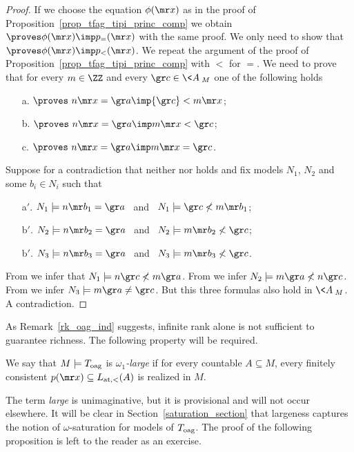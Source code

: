 \begin{proof}
  If we choose the equation $\phi({\mr x})$ as in the proof of Proposition~\ref{prop_tfag_tipi_princ_comp} we obtain $\proves\phi({\mr x})\imp p_{=}({\mr x})$ with the same proof.
  We only need to show that $\proves\phi({\mr x})\imp p_{<}({\mr x})$.
  We repeat the argument of the proof of Proposition~\ref{prop_tfag_tipi_princ_comp} with $<$ for $=$.
  We need to prove that for every $m\in\ZZ$ and every ${\gr c}\in\<A\>_M$ one of the following holds
  \begin{itemize}
  \item[a.] $\proves\   n{\mr x}={\gr a}\imp{\gr c}<m{\mr x}$;
  \item[b.] $\proves\   n{\mr x}={\gr a}\imp m{\mr x}<{\gr c}$;
  \item[c.] $\proves\   n{\mr x}={\gr a}\imp m{\mr x}={\gr c}$.
  \end{itemize}
  Suppose for a contradiction that neither  nor  holds and fix models $N_1$, $N_2$ and some $b_i\in N_i$ such that
  \begin{itemize}
  \item[a$'$.] $N_1\models n{\mr b_1}={\gr a}$ \ and \ $N_1\models {\gr c}\not<m{\mr b_1}$;
  \item[b$'$.] $N_2\models n{\mr b_2}={\gr a}$ \ and \ $N_2\models m{\mr b_2}\not< {\gr c}$;
  \item[b$'$.] $N_3\models n{\mr b_3}={\gr a}$ \ and \ $N_3\models m{\mr b_3}\not< {\gr c}$.
  \end{itemize}
  From  we infer that $N_1\models n{\gr c}\not<m{\gr a}$.
  From  we infer $N_2\models m{\gr a}\not<n{\gr c}$.
  From  we infer $N_3\models m{\gr a}\neq{\gr c}$. 
  But this three formulas also hold in $\<A\>_M$.
  A contradiction.
\end{proof}

As Remark~\ref{rk_oag_ind} suggests, infinite rank alone is not sufficient to guarantee richness.
%
The following property will be required.
\begin{definition}
  We say that $M\models T_{\rm oag}$ is \emph{$\omega_1$-large\/} if for every countable $A\subseteq M$, every finitely consistent $p({\mr x})\subseteq L_{\rm at, <}(A)$ is realized in $M$.
\end{definition}

%
The term \textit{large\/} is unimaginative, but it is provisional and will not occur elsewhere.
%
It will be clear in Section~\ref{saturation_section} that largeness captures the notion of $\omega$-saturation for models of $T_{\rm oag}$. The proof of the following proposition is left to the reader as an exercise.

